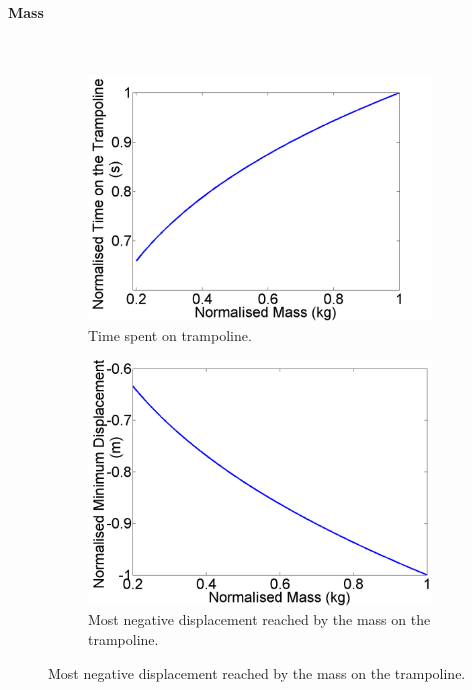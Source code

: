 \paragraph{Mass}\mbox{}\\
\begin{figure}[H]
	\centering
    \begin{subfigure}[t]{0.3\textwidth}
		\includegraphics[width=\textwidth]{Norm_Time_Mass.png}
    	\caption{Time spent on trampoline.}\label{fig:Norm_Time_Mass}
    \end{subfigure}\hfill
	\begin{subfigure}[t]{0.3\textwidth}
		\includegraphics[width=\textwidth]{Norm_MinY_Mass.png}
    	\caption{Most negative displacement reached by the mass on the trampoline.}\label{fig:Norm_MinY_Mass}
    \end{subfigure}\hfill

\end{figure}
